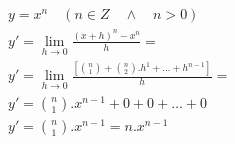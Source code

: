 \begin{ex}
\begin{align}
&y=x^n\quad(n\in Z\quad\wedge\quad n>0)\nonumber\\
&y'=\lim_{h\rightarrow 0} \frac{(x+h)^n-x^n}{h}=\nonumber\\
&y'=\lim_{h\rightarrow 0} \frac{\left[\binom{n}{1}+\binom{n}{2}.h^1+\dots+h^{n-1}\right]}{h}=\nonumber\\
&y'=\binom{n}{1}.x^{n-1}+0+0+\dots+0\nonumber\\
&y'=\binom{n}{1}.x^{n-1}=n.x^{n-1}\nonumber
\end{align}
\end{ex}